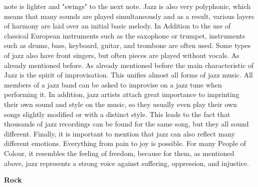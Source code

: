 note is lighter and "swings" to the next note.
Jazz is also very polyphonic, which means that many sounds are played simultaneously and as a result,
various layers of harmony are laid over an initial basic melody.
In Addition to the use of classical European instruments such as the saxophone or trumpet,
instruments such as drums, bass, keyboard, guitar, and trombone are often used.
Some types of jazz also have front singers, but often pieces are played without vocals.\cite{2020MasterclassJazz}
As already mentioned before. As already mentioned before the main characteristic of Jazz is
the spirit of improvisation. This unifies almost all forms of jazz music.
All members of a jazz band can be asked to improvise on a jazz tune when performing it.
In addition, jazz artists attach great importance to imprinting their own sound and style on the music,
so they usually even play their own songs slightly modified or with a distinct style.
This leads to the fact that thousands of jazz recordings can be found for the same song,
but they all sound different.
Finally, it is important to mention that jazz can also reflect many different emotions.
Everything from pain to joy is possible. For many People of Colour, it resembles the feeling of freedom,
because for them, as mentioned above, jazz represents a strong voice against suffering, oppression,
and injustice.\cite{MusicalDictJazz}

\textbf{Rock}

